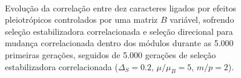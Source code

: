 \begin{figure}[htbp]
    \vspace{-18pt}
    \vspace{11pt}
    \\
    \caption{Evolução da correlação entre dez caracteres ligados por efeitos
        pleiotrópicos controlados por uma matriz $B$ variável, sofrendo seleção estabilizadora correlacionada e seleção
        direcional para mudança correlacionada dentro dos módulos
        durante as 5.000 primeiras gerações, seguidos de 5.000 gerações de
    seleção estabilizadora correlacionada ($\Delta_S = 0.2$, $\mu/\mu_B=5$, $m/p=2$).}
    \label{posselecao}
\end{figure}



